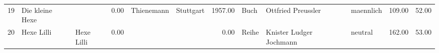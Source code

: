 \begin{table}
\begin{center}
{\begin{tabular}{rllrllrlllrr}
  19 & Die kleine Hexe                                                                                                                                                                                                                                                 &                                                                                                                                                                                                                                                                 & 0.00 & Thienemann                                                                                                                                                                                                                                                      & Stuttgart                                                                                                                                                                                                                                                       & 1957.00 & Buch & Ottfried Preussler                                                                                                                                                                                                                                              & maennlich & 109.00 & 52.00 \\ 
  20 & Hexe Lilli                                                                                                                                                                                                                                                      & Hexe Lilli                                                                                                                                                                                                                                                      & 0.00 &                                                                                                                                                                                                                                                                 &                                                                                                                                                                                                                                                                 & 0.00 & Reihe & Knister Ludger Jochmann                                                                                                                                                                                                                                         & neutral & 162.00 & 53.00 \\ 

\end{tabular}}
\end{center}
\end{table}
